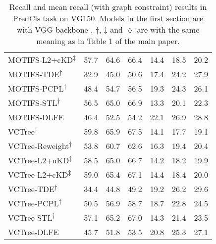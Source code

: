 \documentclass[sigconf]{acmart}
\begin{document}
\begin{table*}[htbp]
{\begin{tabular}{l|c c c c c c}
MOTIFS-L2+cKD\textsuperscript{$\ddagger$} \cite{DBLP:conf/bmvc/WangPL20} & 57.7 & 64.6 & 66.4 & 14.4 & 18.5 & 20.2 \\
MOTIFS-TDE\textsuperscript{$\dagger$} \cite{tang2020unbiased} & 32.9 & 45.0 & 50.6 & 17.4 & 24.2 & 27.9 \\
MOTIFS-PCPL\textsuperscript{$\dagger$} \cite{yan2020pcpl} & 48.4 & 54.7 & 56.5 & 19.3 & 24.3 & 26.1 \\
MOTIFS-STL\textsuperscript{$\dagger$} \cite{chen2019soft} & 56.5 & 65.0 & 66.9 & 13.3 & 20.1 & 22.3 \\
MOTIFS-DLFE & 46.4 & 52.5 & 54.2 & 22.1 & 26.9 & 28.8 \\
\hline
VCTree\textsuperscript{$\dagger$} \cite{tang2019learning,tang2020unbiased} & 59.8 & 65.9 & 67.5 & 14.1 & 17.7 & 19.1 \\
VCTree-Reweight\textsuperscript{$\dagger$} & 53.8 & 60.7 & 62.6 & 16.3 & 19.4 & 20.4 \\
VCTree-L2+uKD\textsuperscript{$\ddagger$} \cite{DBLP:conf/bmvc/WangPL20} & 58.5 & 65.0 & 66.7 & 14.2 & 18.2 & 19.9 \\ 
VCTree-L2+cKD\textsuperscript{$\ddagger$} \cite{DBLP:conf/bmvc/WangPL20} & 59.0 & 65.4 & 67.1 & 14.4 & 18.4 & 20.0 \\ 
VCTree-TDE\textsuperscript{$\dagger$} \cite{tang2020unbiased} & 34.4 & 44.8 & 49.2 & 19.2 & 26.2 & 29.6 \\
VCTree-PCPL\textsuperscript{$\dagger$} \cite{yan2020pcpl} & 50.5 & 56.9 & 58.7 & 18.7 & 22.8 & 24.5 \\
VCTree-STL\textsuperscript{$\dagger$} \cite{chen2019soft} & 57.1 & 65.2 & 67.0 & 14.3 & 21.4 & 23.5 \\
VCTree-DLFE & 45.7 & 51.8 & 53.5 & 20.8 & 25.3 & 27.1 \\
\hline
\end{tabular}
}
\vspace{0.1em}
\caption{Recall and mean recall (with graph constraint) results in PredCls task on VG150. 
Models in the first section are with VGG backbone \cite{simonyan2014very}.
$\dagger$, $\ddagger$ and $\lozenge$ are with the same meaning as in Table 1 of the main paper.
}
\label{tab:sgg_result_predcls}
\end{table*}
\end{document}
